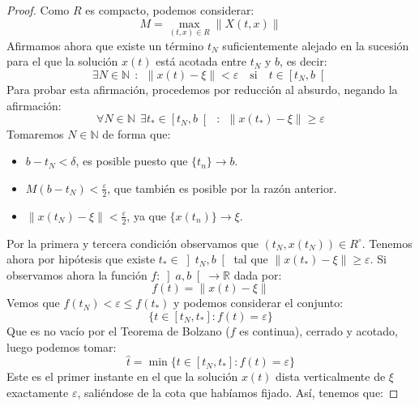 \begin{lema}
\begin{proof}
        \noindent
        Como $R$ es compacto, podemos considerar:
        \begin{equation*}
            M = \max_{(t,x)\in R} \|X(t,x)\|
        \end{equation*}
        Afirmamos ahora que existe un término $t_N$ suficientemente alejado en la sucesión para el que la solución $x(t)$ está acotada entre $t_N$ y $b$, es decir:
        \begin{equation}\label{eq:2lema}
            \exists N\in \mathbb{N}~~:~~ \|x(t) - \xi\| < \varepsilon \quad \text{si} \quad t\in \left[t_N,b\right[
        \end{equation}
        Para probar esta afirmación, procedemos por reducción al absurdo, negando la afirmación:
        \begin{equation*}
            \forall N\in \mathbb{N}~~\exists t_\ast \in \left[t_N,b\right[~~:~~ \|x(t_\ast) - \xi\| \geq \varepsilon
        \end{equation*}
        Tomaremos $N\in \mathbb{N}$ de forma que:
        \begin{itemize}
            \item $b-t_N< \delta$, es posible puesto que $\{t_n\}\to b$.
            \item $M(b-t_N) < \frac{\varepsilon}{2}$, que también es posible por la razón anterior.
            \item $\|x(t_N)-\xi\| < \frac{\varepsilon}{2}$, ya que $\{x(t_n)\}\to \xi$.
        \end{itemize}
        Por la primera y tercera condición observamos que $(t_N,x(t_N))\in R^\circ$. Tenemos ahora por hipótesis que existe $t_\ast \in \left]t_N,b\right[$ tal que $\|x(t_\ast)-\xi\| \geq \varepsilon$. Si observamos ahora la función $f:\left]a,b\right[\to \mathbb{R}$ dada por:
        \begin{equation*}
            f(t) = \|x(t)-\xi\|
        \end{equation*}
        Vemos que $f(t_N)< \varepsilon\leq f(t_\ast)$ y podemos considerar el conjunto:
        \begin{equation*}
            \{t\in [t_N,t_\ast] : f(t) = \varepsilon\}
        \end{equation*}
        Que es no vacío por el Teorema de Bolzano ($f$ es continua), cerrado y acotado, luego podemos tomar:
        \begin{equation*}
            \hat{t} = \min\{t\in [t_N,t_\ast] : f(t) = \varepsilon\}
        \end{equation*}
        Este es el primer instante en el que la solución $x(t)$ dista verticalmente de $\xi$ exactamente $\varepsilon$, saliéndose de la cota que habíamos fijado. Así, tenemos que:

\end{proof}
\end{lema}

